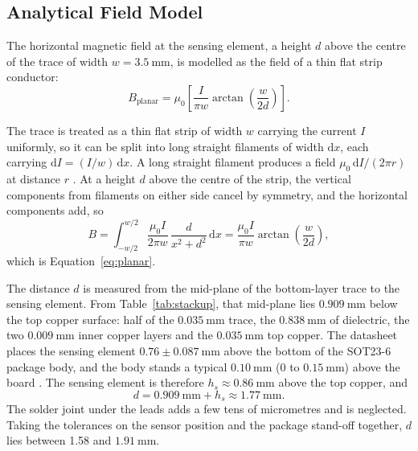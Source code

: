 \documentclass[12pt,a4paper]{article}
\begin{document}
\subsection{Analytical Field Model}
\label{sec:field-model}

The horizontal magnetic field at the sensing element, a height $d$ above the centre of the trace of width $w = \SI{3.5}{\milli\metre}$, is modelled as the field of a thin flat strip conductor:
\begin{equation}
B_{\text{planar}} = \mu_0 \left[ \frac{I}{\pi w} \arctan\left( \frac{w}{2d} \right) \right].
\label{eq:planar}
\end{equation}

The trace is treated as a thin flat strip of width $w$ carrying the current $I$ uniformly, so it can be split into long straight filaments of width $\mathrm{d}x$, each carrying $\mathrm{d}I = (I/w)\,\mathrm{d}x$. A long straight filament produces a field $\mu_0\,\mathrm{d}I/(2\pi r)$ at distance $r$ \cite{openstax_up2}. At a height $d$ above the centre of the strip, the vertical components from filaments on either side cancel by symmetry, and the horizontal components add, so
\begin{equation}
B = \int_{-w/2}^{w/2} \frac{\mu_0 I}{2\pi w}\,\frac{d}{x^2+d^2}\,\mathrm{d}x = \frac{\mu_0 I}{\pi w}\arctan\!\left(\frac{w}{2d}\right),
\end{equation}
which is Equation~\eqref{eq:planar}.

The distance $d$ is measured from the mid-plane of the bottom-layer trace to the sensing element. From Table~\ref{tab:stackup}, that mid-plane lies $\SI{0.909}{\milli\metre}$ below the top copper surface: half of the $\SI{0.035}{\milli\metre}$ trace, the $\SI{0.838}{\milli\metre}$ of dielectric, the two $\SI{0.009}{\milli\metre}$ inner copper layers and the $\SI{0.035}{\milli\metre}$ top copper. The datasheet places the sensing element $0.76 \pm \SI{0.087}{\milli\metre}$ above the bottom of the SOT23-6 package body, and the body stands a typical $\SI{0.10}{\milli\metre}$ (0 to $\SI{0.15}{\milli\metre}$) above the board \cite{ct100_datasheet}. The sensing element is therefore $h_s \approx \SI{0.86}{\milli\metre}$ above the top copper, and
\begin{equation}
d = \SI{0.909}{\milli\metre} + h_s \approx \SI{1.77}{\milli\metre}.
\label{eq:d-stackup}
\end{equation}
The solder joint under the leads adds a few tens of micrometres and is neglected. Taking the tolerances on the sensor position and the package stand-off together, $d$ lies between 1.58 and $\SI{1.91}{\milli\metre}$.
\end{document}

